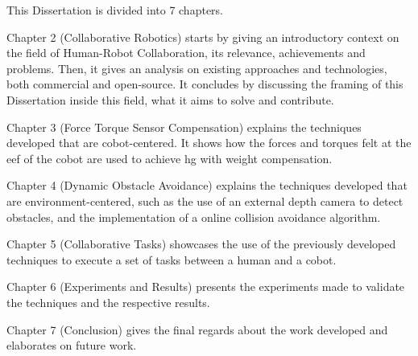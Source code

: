 \par This Dissertation is divided into 7 chapters.
\par Chapter 2 (Collaborative Robotics) starts by giving an introductory context on the field of Human-Robot Collaboration, its relevance, achievements and problems. Then, it gives an analysis on existing approaches and technologies, both commercial and open-source. It concludes by discussing the framing of this Dissertation inside this field, what it aims to solve and contribute.
\par Chapter 3 (Force Torque Sensor Compensation) explains the techniques developed that are cobot-centered. It shows how the forces and torques felt at the \ac{eef} of the cobot are used to achieve \ac{hg} with weight compensation.
\par Chapter 4 (Dynamic Obstacle Avoidance) explains the techniques developed that are environment-centered, such as the use of an external depth camera to detect obstacles, and the implementation of a online collision avoidance algorithm.
\par Chapter 5 (Collaborative Tasks) showcases the use of the previously developed techniques to execute a set of tasks between a human and a cobot.
\par Chapter 6 (Experiments and Results) presents the experiments made to validate the techniques and the respective results.
\par Chapter 7 (Conclusion) gives the final regards about the work developed and elaborates on future work.
